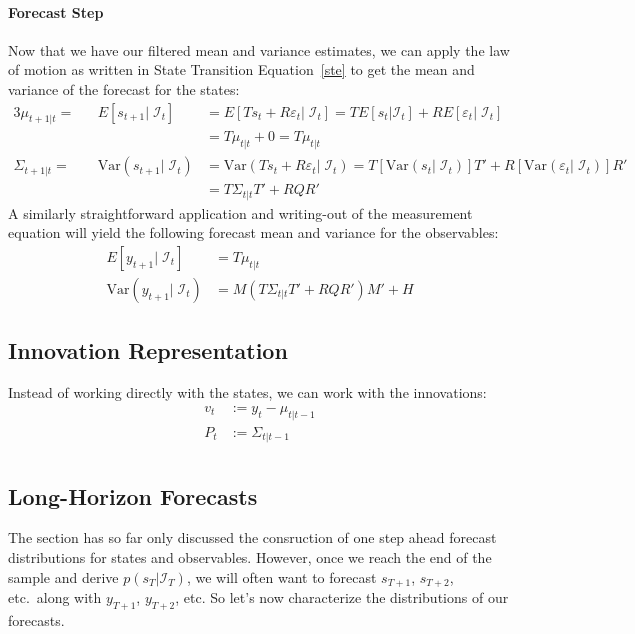 \documentclass[a4paper,12pt]{article}
\begin{document}
\paragraph{Forecast Step} Now that we have our filtered mean and
variance estimates, we can apply the law of motion as written in State
Transition Equation~\ref{ste} to get the mean and variance of the
forecast for the states:
\begin{alignat*}{3}
  \mu_{t+1|t} =&& E[s_{t+1}|\;\mathcal{I}_{t}] &=
    E[Ts_t + R\varepsilon_t |\;\mathcal{I}_{t}] =
    TE[s_t | \mathcal{I}_{t}]
    + RE[\varepsilon_t |\;\mathcal{I}_{t}]  \\
    && &= T\mu_{t|t} + 0 = T\mu_{t|t} \\
  \Sigma_{t+1|t} = &&\text{Var}(s_{t+1}|\;\mathcal{I}_{t})
  &= \text{Var}(Ts_t + R\varepsilon_t |\;\mathcal{I}_{t})
  = T[\text{Var}(s_t|\;\mathcal{I}_{t})]T'
  + R[\text{Var}(\varepsilon_t|\;\mathcal{I}_{t})]R' \\
  && &= T\Sigma_{t|t}T' + RQR'
\end{alignat*}
A similarly straightforward application and writing-out of the
measurement equation will yield the following forecast mean and variance
for the observables:
\begin{align*}
  E[y_{t+1}|\;\mathcal{I}_{t}] &= T\mu_{t|t} \\
  \text{Var}(y_{t+1}|\;\mathcal{I}_{t})
    &= M\left(T\Sigma_{t|t}T' + RQR'\right)M' + H
\end{align*}

\subsection{Innovation Representation}

Instead of working directly with the states, we can work with the
innovations:
\begin{align*}
  v_t &:= y_t - \mu_{t|t-1}\\
  P_t &:= \Sigma_{t|t-1} \\
\end{align*}

\subsection{Long-Horizon Forecasts}

The section has so far only discussed the consruction of one step ahead
forecast distributions for states and observables. However, once we
reach the end of the sample and derive $p(s_T | \mathcal{I}_{T})$, we
will often want to forecast $s_{T+1}$, $s_{T+2}$, etc.\ along with
$y_{T+1}$, $y_{T+2}$, etc. So let's now characterize the distributions
of our forecasts.
\end{document}
